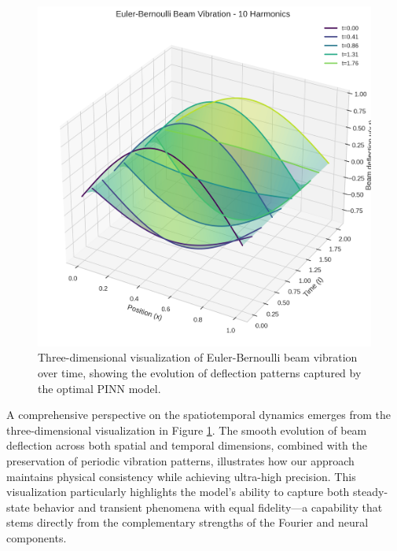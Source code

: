 \begin{figure}[ht]
    \centering
    \includegraphics[width = 1.0\linewidth]{figures/euler_bernoulli_3d_10h.png}
    \caption{Three-dimensional visualization of Euler-Bernoulli beam vibration over time, showing the evolution of deflection patterns captured by the optimal PINN model.}
    \label{fig:beam_3d}
\end{figure}

A comprehensive perspective on the spatiotemporal dynamics emerges from the three-dimensional visualization in Figure \ref{fig:beam_3d}. The smooth evolution of beam deflection across both spatial and temporal dimensions, combined with the preservation of periodic vibration patterns, illustrates how our approach maintains physical consistency while achieving ultra-high precision. This visualization particularly highlights the model's ability to capture both steady-state behavior and transient phenomena with equal fidelity—a capability that stems directly from the complementary strengths of the Fourier and neural components.

